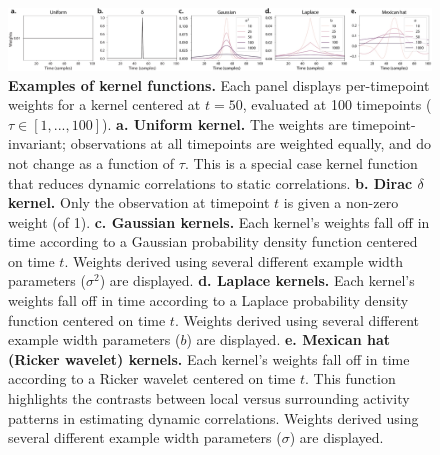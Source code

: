\documentclass[english]{article}
\begin{document}
\begin{figure}
  \centering
  \includegraphics[width=\textwidth]{figs/kernels}
  \caption{\textbf{Examples of kernel functions.} Each panel displays
    per-timepoint weights for a kernel centered at $t = 50$, evaluated
    at 100 timepoints ($\tau \in \left[1, ..., 100\right]$).
   \textbf{a. Uniform kernel.} The weights are timepoint-invariant;
    observations at all timepoints are weighted equally, and do not
    change as a function of $\tau$.  This is a special case kernel
    function that reduces dynamic correlations to static correlations.
   \textbf{b. Dirac $\delta$ kernel.} Only the observation at
    timepoint $t$ is given a non-zero weight (of 1).
   \textbf{c. Gaussian kernels.} Each kernel's weights fall off in
    time according to a Gaussian probability density function centered
    on time $t$.  Weights derived using several different example
    width parameters ($\sigma^2$) are displayed.  \textbf{d. Laplace
       kernels.}  Each kernel's weights fall off in time according to a
    Laplace probability density function centered on time $t$.
    Weights derived using several different example width parameters
    ($b$) are displayed.  \textbf{e. Mexican hat (Ricker wavelet)
       kernels.}  Each kernel's weights fall off in time according to a
    Ricker wavelet centered on time $t$.  This function highlights the
    contrasts between local versus surrounding activity
    patterns in estimating dynamic correlations. Weights derived using
    several different example width parameters ($\sigma$) are
    displayed.}
  \label{fig:kernels}
\end{figure}
\end{document}
